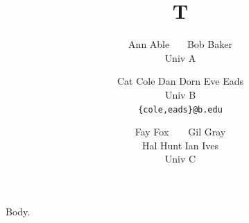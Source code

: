 \documentclass{article}
\title{T}
\author{Ann Able \ \ \ Bob Baker \\ Univ A
\and
Cat Cole \quad Dan Dorn \hspace{1em} Eve Eads \\ Univ B \\ \texttt{\{cole,eads\}@b.edu}
\and
Fay Fox~~~~Gil Gray\quad \\ Hal Hunt \hfill Ian Ives \\ Univ C}
\begin{document}
\maketitle
Body.
\end{document}
